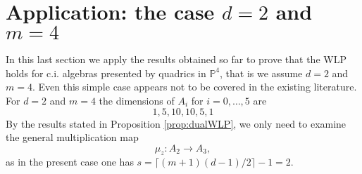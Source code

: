 \documentclass[10pt, a4paper]{amsart}
\theoremstyle{plain}
\theoremstyle{definition}
\theoremstyle{remark}
\def\PP{\mathbb{P}}
\begin{document}
\begin{comment}
Moreover, for $[z]\in\PP(A_1)$ general and any $[w]\not=[z]$ one has $\dim \langle z,w\rangle A_1\geq 2m$, unless the following properties hold.

\begin{enumerate}
\item $m=4$ and $\dim \PP(I_2)\cap R_4=3$.
\item The incidence variety
$$\varUpsilon=\{(\Pi,[F])\ |\  \Pi\in \operatorname{Gr}(m-2,\PP(U)),\ [F]\in \PP(I_2),\ \Pi \subset V(F)\}$$ 
 has $\dim\varUpsilon=4$ and there exist $4$-dimensional irreducible components $\varUpsilon'\subseteq \varUpsilon$ such that,
 denoting $\pi_1(\Pi,[F])=\Pi$ and $\pi_2(\Pi,[F])=[F]$ the two projections, one has $\dim\pi_1(\varUpsilon')=\dim\pi_2(\varUpsilon')=3$. Any $\Pi=V(z,w)$ with $z$ general and such that $\dim \langle z,w\rangle A_1= 2m-1$ is such that $\Pi\in\pi_1(\varUpsilon')$ for one of these components.
 \end{enumerate}
 \begin{itemize} 
 \item $\pi_2(\varUpsilon')\subset R_4$ and  $\pi_2(\varUpsilon')\not\subset R_3$.
 \item $\dim \pi_2(\varUpsilon')\leq 3$, as by Proposition \ref{prop:stratI2}, we know $\dim \PP(I_2)\cap R_4\leq 3$.
 \item As a consequence, since a general $[F]\in \pi_2(\varUpsilon')$ has rank $4$ and it contains $\infty^1$ spaces $\Pi$, one has  $\dim\varUpsilon'\leq 4$.
 \item On the other hand, as any general $\Pi\in \pi_1(\varUpsilon')$ is contained in $\infty^1$ hyperplanes $V(z)$ with $[z]\in \PP(A_1)$ general, one must have $$m\leq 1+\dim\pi_1(\varUpsilon')=1+\dim\varUpsilon'-1\leq 4,$$ therefore $m=4$ and all the previeous inequalities are actually equalities.
 \end{itemize}
 In particular $\dim \pi_1(\varUpsilon')=3$ and hence $\dim \varUpsilon'=4$. by applying the same arguments as above to every irreducible component of $\varUpsilon$, one has $\dim\varUpsilon\leq 4$, then $\varUpsilon'$ is a irreducible component of $\varUpsilon$. Moreover $\dim\pi_2(\varUpsilon')=3$ and therefore it is a irreducible component of $ \pi_2(\varUpsilon)= \PP(I_2)\cap R_4$, which also has the maximal possible dimension $\dim \PP(I_2)\cap R_4=3$.

 
\end{comment}
 \section{Application: the case $d=2$ and $m=4$}\label{sec:d=2m=4}
 In this last section we apply the results obtained so far to prove that the WLP holds for c.i. algebras presented by quadrics in $\PP^4$, that is we assume $d=2$ and $m=4$. Even this simple case appears not to be covered in the existing literature. For $d=2$ and $m=4$ the dimensions of $A_i$ for $i=0,\ldots,5$ are $$1,5,10,10,5,1$$
By the results stated in Proposition \ref{prop:dualWLP}, we only need to examine the general multiplication map $$\mu_z\colon A_2\to A_3,$$ as in the present case one has $s=\lceil(m+1)(d-1)/2\rceil-1=2$.
 
\end{document}

